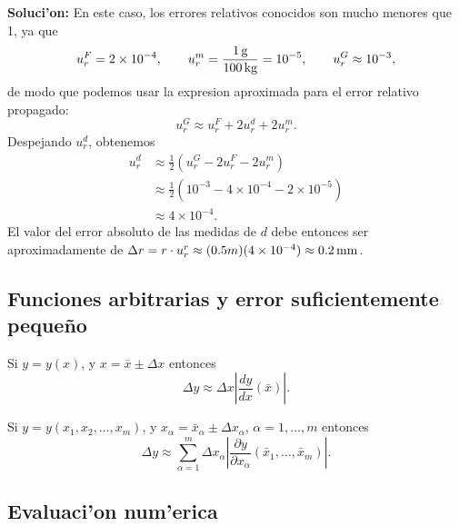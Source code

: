 \textbf{Soluci'on:} En este caso, los errores relativos conocidos son mucho menores que 1, ya que
\begin{equation}
u_r^F =2\times 10^{-4}, \qquad u_r^m = \frac{1\,\rm g}{100\,\rm kg}  = 10^{-5}, \qquad u_r^G\approx 10^{-3},
\end{equation}
de modo que podemos usar la expresion aproximada para el error relativo propagado:
\begin{equation}
u_r^G \approx u_r^F + 2u_r^d + 2u_r^m.
\end{equation}
Despejando $u_r^d$, obtenemos
\begin{align}
u_r^d &\approx \frac{1}{2}\left(u_r^G - 2u_r^F - 2u_r^m\right) \\
& \approx\frac{1}{2}\left(10^{-3} - 4\times 10^{-4} - 2\times 10^{-5}\right) \\
& \approx 4\times 10^{-4}.
\end{align}
El valor del error absoluto de las medidas de $d$ debe entonces ser aproximadamente de $\Delta r = r\cdot u_r^r \approx (0.5 m)(4\times 10^{-4})\approx 0.2\,\rm mm$.

\subsection{Funciones arbitrarias y error suficientemente peque\~no}

Si $y=y(x)$, y $x=\bar{x}\pm \Delta x$ entonces
\begin{equation}
\Delta y \approx \Delta x \left|\frac{dy}{dx}(\bar{x})\right|.
\end{equation}

Si $y=y(x_1,x_2,\dots,x_m)$, y $x_\alpha=\bar{x}_\alpha\pm \Delta x_\alpha$, $\alpha=1,\dots, m$ entonces
\begin{equation}
\Delta y \approx \sum_{\alpha=1}^m\Delta x_\alpha \left|\frac{\partial y}{\partial x_\alpha}(\bar{x}_1,\dots,\bar{x}_m)\right|.
\end{equation}

\subsection{Evaluaci'on num'erica}
